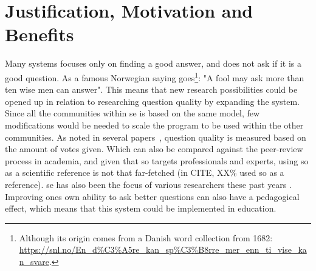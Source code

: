 \section{Justification, Motivation and Benefits}
\label{sec:justification}
Many systems focuses only on finding a good answer, and does not ask if it is a good question.
As a famous Norwegian saying goes\footnote{
	Although its origin comes from a Danish word collection from 1682: 
	\url{https://snl.no/En\_d\%C3\%A5re_kan_sp\%C3\%B8rre_mer_enn_ti_vise_kan_svare}.
}: "A fool may ask more than ten wise men can answer".
This means that new research possibilities could be opened up in relation to researching question quality by expanding the system. 
Since all the communities within \gls{se} is based on the same model, few modifications would be needed to scale the program to be used within the other communities.
As noted in several papers~, question quality is measured based on the amount of votes given. 
Which can also be compared against the peer-review process in academia, and given that \gls{so} targets professionals and experts, 
using \gls{so} as a scientific reference is not that far-fetched (in CITE, XX\% used \gls{so} as a reference). 
\gls{se} has also been the focus of various researchers these past years \cite{Vasilescu2012}.
Improving ones own ability to ask better questions can also have a pedagogical effect, which means that this system could be implemented in education. 

\begin{comment}
The quality of a question is based on the votes given by the users of the StackOverflow community. 
Therefore the vote score was used to label the question as either good (score > 0) or bad (score < 0). 
This is justified by the fact that you can draw a comparison between the peer-review process used in academia and the peer-review process used in StackOverflow. 
The process starts with someone posting a question, which is then read, scored and given feedback (through comments or answers). 
The feedback can then improve the question through edits by the poster, based on the feedback given 
(e.g. adding additional information or explaining how the given problem(s) occurred).
\vspace{0.5em}\newline
Scikit-learns \gls{svm} implementation is based on libsvm \cite{ChangLin2011}, but it is simpler to use. 
In addition, scikit-learn focuses on code quality\footnote{Coverage on their GitHub repository was 94\% on 06. May 2015.}, 
to ensure that everything works as it should \cite[p.~3]{PedregosaVaroquauxGramfortEtAl2011}.
\vspace{0.5em}\newline
It is not a lot of research being done related to asking and defining good questions. 
Although the focus is only on programming questions, it can still be useful to improve question quality. 
Even if you cannot predict if it is a good question, you can still avoid asking a bad questions. 
This in turn can help to improve the question quality (at least acceptability), and avoid asking questions that will be closed or ignored on StackOverflow.
\end{comment}

